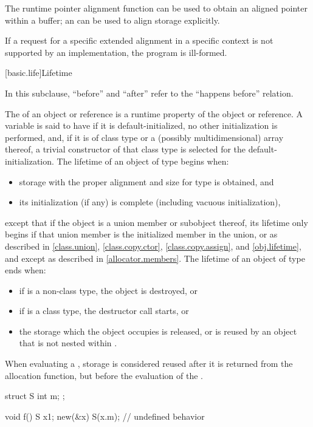 \pnum
\begin{note}
The runtime pointer alignment function
can be used to obtain an aligned pointer within a buffer;
an 
can be used to align storage explicitly.
\end{note}

\pnum
If a request for a specific extended alignment in a specific context is not
supported by an implementation, the program is ill-formed.

[basic.life]{Lifetime}

\pnum
In this subclause, ``before'' and ``after'' refer to the ``happens before''
relation.

\pnum
{}%
The  of an object or reference is a runtime property of the
object or reference.
A variable is said to have 
if it is default-initialized, no other initialization is performed, and,
if it is of class type or a (possibly multidimensional) array thereof,
a trivial constructor of that class type is selected for
the default-initialization.
The lifetime of an object of type  begins when:
\begin{itemize}
\item storage with the proper alignment and size
  for type  is obtained, and
\item its initialization (if any) is complete
  (including vacuous initialization),
\end{itemize}
except that if the object is a union member or subobject thereof,
its lifetime only begins if that union member is the
initialized member in the union,
or as described in
\ref{class.union}, \ref{class.copy.ctor}, \ref{class.copy.assign},
and \ref{obj.lifetime},
and except as described in \ref{allocator.members}.
The lifetime of an object  of type  ends when:
\begin{itemize}
\item if  is a non-class type, the object is destroyed, or
\item if  is a class type, the destructor call starts, or
\item the storage which the object occupies is released,
or is reused by an object that is not nested within .
\end{itemize}
When evaluating a ,
storage is considered reused after it is returned from the allocation function,
but before the evaluation of the .
\begin{example}
\begin{codeblock}
struct S {
  int m;
};

void f() {
  S x{1};
  new(&x) S(x.m);   // undefined behavior
}
\end{codeblock}
\end{example}

